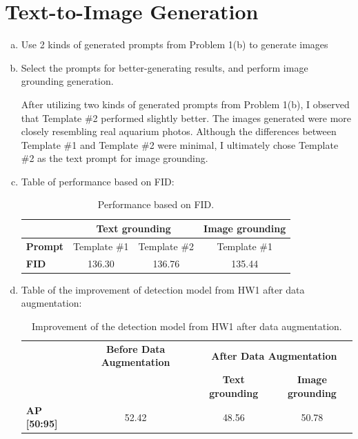 \documentclass[10pt,a4paper]{article}
\begin{document}
\section*{Text-to-Image Generation}
\begin{enumerate}[(a)]
\item Use 2 kinds of generated prompts from Problem 1(b) to generate images


\item Select the prompts for better-generating results, and perform image grounding generation.

After utilizing two kinds of generated prompts from Problem 1(b), I observed that Template \#2 performed slightly better. The images generated were more closely resembling real aquarium photos. Although the differences between Template \#1 and Template \#2 were minimal, I ultimately chose Template \#2 as the text prompt for image grounding.


\item Table of performance based on FID:
\begin{table}[h!]
\centering
\caption{Performance based on FID.}
\begin{tabular}{lccc}
\toprule
 & \multicolumn{2}{c}{\textbf{Text grounding}} & \textbf{Image grounding} \\
\midrule
\textbf{Prompt} & Template \#1 & Template \#2 & Template \#1 \\
\textbf{FID} & 136.30 & 136.76 & 135.44 \\
\bottomrule
\end{tabular}
\end{table}
    
\item Table of the improvement of detection model from HW1 after data augmentation:

\begin{table}[h!]
\centering
\caption{Improvement of the detection model from HW1 after data augmentation.}
\begin{tabular}{lccc}
\toprule
 & \textbf{Before Data Augmentation} & \multicolumn{2}{c}{\textbf{After Data Augmentation}} \\
\cmidrule{3-4}
 & & \textbf{Text grounding} & \textbf{Image grounding} \\
\midrule
\textbf{AP [50:95]} & 52.42 & 48.56 & 50.78 \\
\bottomrule
\end{tabular}
\end{table}


\end{enumerate}
\end{document}
